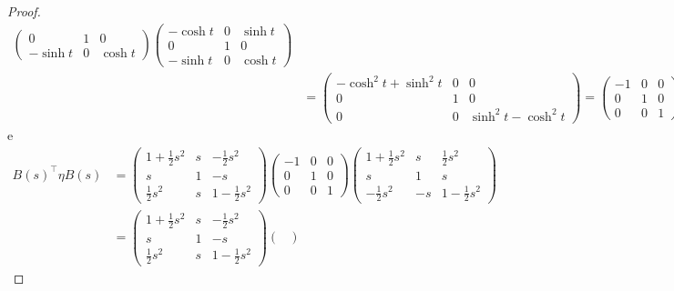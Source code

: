 \begin{proof}
\begin{align*}
\begin{pmatrix}
            0 & 1 & 0\\
            -\sinh{t} & 0 & \cosh{t}
        \end{pmatrix}
        \begin{pmatrix}
            -\cosh{t} & 0 & \sinh{t}\\
            0 & 1 & 0\\
            -\sinh{t} & 0 & \cosh{t}
        \end{pmatrix}\\&=
        \begin{pmatrix}
            -\cosh^2t + \sinh^2t & 0 & 0\\
            0 & 1 & 0\\
            0 & 0 & \sinh^2t - \cosh^2 t
        \end{pmatrix} =
        \begin{pmatrix}
            -1 & 0 & 0\\
            0 & 1 & 0\\
            0 & 0 & 1
        \end{pmatrix} = \eta
    \end{align*}
    e
    \begin{align*}
        B(s)^\intercal \eta B(s)
        &=
        \begin{pmatrix}
            1 + \frac12 s^2 & s & -\frac12s^2\\
            s & 1 & -s\\
            \frac12s^2 & s & 1 - \frac12s^2
        \end{pmatrix}
        \begin{pmatrix}
            -1 & 0 & 0\\
            0 & 1 & 0\\
            0 & 0 & 1
        \end{pmatrix}
        \begin{pmatrix}
            1 + \frac12 s^2 & s & \frac12s^2\\
            s & 1 & s\\
            -\frac12s^2 & -s & 1 - \frac12s^2
        \end{pmatrix}\\
        &=
        \begin{pmatrix}
            1 + \frac12 s^2 & s & -\frac12s^2\\
            s & 1 & -s\\
            \frac12s^2 & s & 1 - \frac12s^2
        \end{pmatrix}
        \begin{pmatrix}

\end{pmatrix}
\end{align*}
\end{proof}
